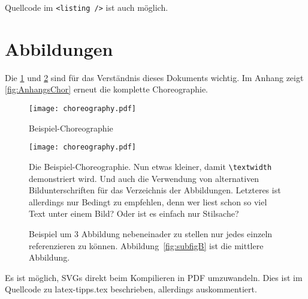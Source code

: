 Quellcode im \lstinline|<listing />| ist auch möglich.

\section{Abbildungen}

Die \cref{fig:chor1} und \ref{fig:chor2} sind für das Verständnis dieses Dokuments wichtig.
Im Anhang zeigt \vref{fig:AnhangsChor} erneut die komplette Choreographie.

\begin{figure}
  \centering
  \texttt{[image: choreography.pdf]}
  \caption{Beispiel-Choreographie}
  \label{fig:chor1}
\end{figure}

\begin{figure}
  \centering
  \texttt{[image: choreography.pdf]}
  \caption[Beispiel-Choreographie]{Die Beispiel-Choreographie. Nun etwas kleiner, damit \texttt{\textbackslash textwidth} demonstriert wird. Und auch die Verwendung von alternativen Bildunterschriften für das Verzeichnis der Abbildungen. Letzteres ist allerdings nur Bedingt zu empfehlen, denn wer liest schon so viel Text unter einem Bild? Oder ist es einfach nur Stilsache?}
  \label{fig:chor2}
\end{figure}


\begin{figure}
  \centering
	\caption{Beispiel um 3 Abbildung nebeneinader zu stellen nur jedes einzeln referenzieren zu können. Abbildung~\ref{fig:subfigB}
 ist die mittlere Abbildung.}
\label{fig:subfig_example}
\end{figure}

Es ist möglich, SVGs direkt beim Kompilieren in PDF umzuwandeln.
Dies ist im Quellcode zu latex-tipps.tex beschrieben, allerdings auskommentiert.

